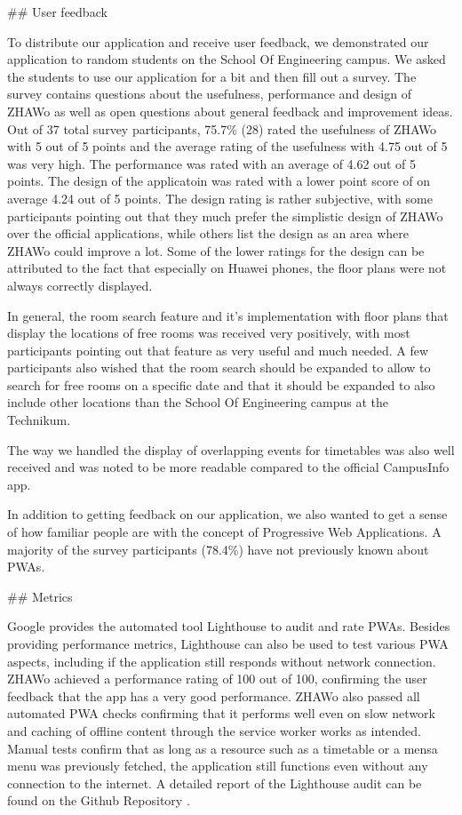 \begin{markdown}
## User feedback

To distribute our application and receive user feedback, we demonstrated our application to random students on the School Of Engineering campus. We asked the students to use our application for a bit and then fill out a survey. The survey contains questions about the usefulness, performance and design of ZHAWo as well as open questions about general feedback and improvement ideas. Out of 37 total survey participants, 75.7\% (28) rated the usefulness of ZHAWo with 5 out of 5 points and the average rating of the usefulness with 4.75 out of 5 was very high. The performance was rated with an average of 4.62 out of 5 points. The design of the applicatoin was rated with a lower point score of on average 4.24 out of 5 points. The design rating is rather subjective, with some participants pointing out that they much prefer the simplistic design of ZHAWo over the official applications, while others list the design as an area where ZHAWo could improve a lot. Some of the lower ratings for the design can be attributed to the fact that especially on Huawei phones, the floor plans were not always correctly displayed.

In general, the room search feature and it's implementation with floor plans that display the locations of free rooms was received very positively, with most participants pointing out that feature as very useful and much needed. A few participants also wished that the room search should be expanded to allow to search for free rooms on a specific date and that it should be expanded to also include other locations than the School Of Engineering campus at the Technikum.

The way we handled the display of overlapping events for timetables was also well received and was noted to be more readable compared to the official CampusInfo app.

In addition to getting feedback on our application, we also wanted to get a sense of how familiar people are with the concept of Progressive Web Applications. A majority of the survey participants (78.4\%) have not previously known about PWAs.

## Metrics

Google provides the automated tool Lighthouse \cite{Lighthouse} to audit and rate PWAs. Besides providing performance metrics, Lighthouse can also be used to test various PWA aspects, including if the application still responds without network connection. ZHAWo achieved a performance rating of 100 out of 100, confirming the user feedback that the app has a very good performance. ZHAWo also passed all automated PWA checks confirming that it performs well even on slow network and caching of offline content through the service worker works as intended. Manual tests confirm that as long as a resource such as a timetable or a mensa menu was previously fetched, the application still functions even without any connection to the internet. A detailed report of the Lighthouse audit can be found on the Github Repository \cite{OurGithub}.


\end{markdown}
